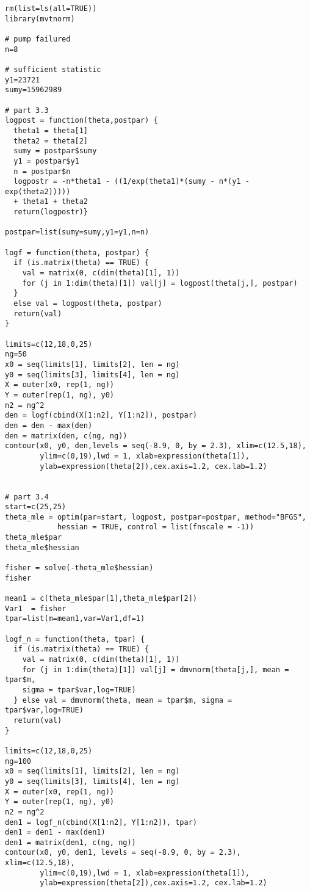 \documentclass[a4paper, 11pt]{article}
\begin{document}
\begin{verbatim}
rm(list=ls(all=TRUE))
library(mvtnorm)

# pump failured
n=8

# sufficient statistic
y1=23721
sumy=15962989

# part 3.3
logpost = function(theta,postpar) {
  theta1 = theta[1]
  theta2 = theta[2]
  sumy = postpar$sumy
  y1 = postpar$y1
  n = postpar$n
  logpostr = -n*theta1 - ((1/exp(theta1)*(sumy - n*(y1 - exp(theta2))))) 
  + theta1 + theta2
  return(logpostr)}

postpar=list(sumy=sumy,y1=y1,n=n)

logf = function(theta, postpar) {
  if (is.matrix(theta) == TRUE) {
    val = matrix(0, c(dim(theta)[1], 1))
    for (j in 1:dim(theta)[1]) val[j] = logpost(theta[j,], postpar)
  }
  else val = logpost(theta, postpar)
  return(val)
}

limits=c(12,18,0,25)
ng=50
x0 = seq(limits[1], limits[2], len = ng)
y0 = seq(limits[3], limits[4], len = ng)
X = outer(x0, rep(1, ng))
Y = outer(rep(1, ng), y0)
n2 = ng^2
den = logf(cbind(X[1:n2], Y[1:n2]), postpar)
den = den - max(den)
den = matrix(den, c(ng, ng))
contour(x0, y0, den,levels = seq(-8.9, 0, by = 2.3), xlim=c(12.5,18),
		ylim=c(0,19),lwd = 1, xlab=expression(theta[1]),
        ylab=expression(theta[2]),cex.axis=1.2, cex.lab=1.2)


# part 3.4
start=c(25,25)
theta_mle = optim(par=start, logpost, postpar=postpar, method="BFGS",
			hessian = TRUE, control = list(fnscale = -1))
theta_mle$par
theta_mle$hessian

fisher = solve(-theta_mle$hessian)
fisher

mean1 = c(theta_mle$par[1],theta_mle$par[2])
Var1  = fisher
tpar=list(m=mean1,var=Var1,df=1)

logf_n = function(theta, tpar) {
  if (is.matrix(theta) == TRUE) {
    val = matrix(0, c(dim(theta)[1], 1))
    for (j in 1:dim(theta)[1]) val[j] = dmvnorm(theta[j,], mean = tpar$m, 
    sigma = tpar$var,log=TRUE)
  } else val = dmvnorm(theta, mean = tpar$m, sigma = tpar$var,log=TRUE)
  return(val)
}

limits=c(12,18,0,25)
ng=100
x0 = seq(limits[1], limits[2], len = ng)
y0 = seq(limits[3], limits[4], len = ng)
X = outer(x0, rep(1, ng))
Y = outer(rep(1, ng), y0)
n2 = ng^2
den1 = logf_n(cbind(X[1:n2], Y[1:n2]), tpar)
den1 = den1 - max(den1)
den1 = matrix(den1, c(ng, ng))
contour(x0, y0, den1, levels = seq(-8.9, 0, by = 2.3), xlim=c(12.5,18),
		ylim=c(0,19),lwd = 1, xlab=expression(theta[1]),
        ylab=expression(theta[2]),cex.axis=1.2, cex.lab=1.2)
        

\end{verbatim}
\end{document}
